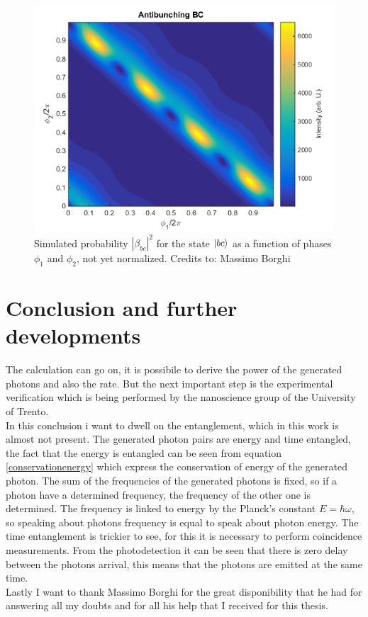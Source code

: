 \begin{figure}
\centering
\includegraphics[width = .8\textwidth]{img/Antibunching_BC}
\caption{Simulated probability $|\beta_{bc}|^2$ for the state $\ket{bc}$ as a function of phases $\phi_1$ and $\phi_2$, not yet normalized. Credits to: Massimo Borghi}\label{antibounchstate}
\end{figure}

\section{Conclusion and further developments}
The calculation can go on, it is possibile to derive the power of the generated photons and also the rate. But the next important step is the experimental verification which is being performed by the nanoscience group of the University of Trento.\\
In this conclusion i want to dwell on the entanglement, which in this work is almost not present. The generated photon pairs are energy and time entangled, the fact that the energy is entangled can be seen from equation \eqref{conservationenergy} which express the conservation of energy of the generated photon. The sum of the frequencies of the generated photons is fixed, so if a photon have a determined frequency, the frequency of the other one is determined. The frequency is linked to energy by the Planck's constant $E = \hbar \omega$, so speaking about photons frequency is equal to speak about photon energy. The time entanglement is trickier to see, for this it is necessary to perform coincidence measurements. From the photodetection it can be seen that there is zero delay between the photons arrival, this means that the photons are emitted at the same time.\\
Lastly I want to thank Massimo Borghi for the great disponibility that he had for answering all my doubts and for all his help that I received for this thesis.